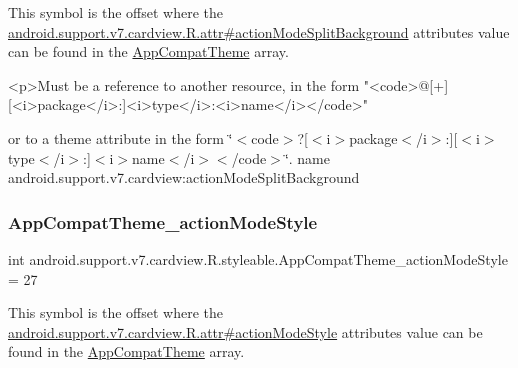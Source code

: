This symbol is the offset where the \hyperlink{classandroid_1_1support_1_1v7_1_1cardview_1_1R_1_1attr_aa4274d8662f21f4ce9f787ee5bfd927a}{android.\+support.\+v7.\+cardview.\+R.\+attr\#action\+Mode\+Split\+Background} attribute\textquotesingle{}s value can be found in the \hyperlink{classandroid_1_1support_1_1v7_1_1cardview_1_1R_1_1styleable_a52e6f69f954ecc2622d72c0b4d298938}{App\+Compat\+Theme} array.

\begin{DoxyVerb}      <p>Must be a reference to another resource, in the form "<code>@[+][<i>package</i>:]<i>type</i>:<i>name</i></code>"
\end{DoxyVerb}
 or to a theme attribute in the form \char`\"{}$<$code$>$?\mbox{[}$<$i$>$package$<$/i$>$\+:\mbox{]}\mbox{[}$<$i$>$type$<$/i$>$\+:\mbox{]}$<$i$>$name$<$/i$>$$<$/code$>$\char`\"{}.  name android.\+support.\+v7.\+cardview\+:action\+Mode\+Split\+Background \mbox{\label{classandroid_1_1support_1_1v7_1_1cardview_1_1R_1_1styleable_a50c09e1d32d726cfef89e5ad6164aac9}} 
\subsubsection{\texorpdfstring{App\+Compat\+Theme\+\_\+action\+Mode\+Style}{AppCompatTheme\_actionModeStyle}}
{\footnotesize\ttfamily int android.\+support.\+v7.\+cardview.\+R.\+styleable.\+App\+Compat\+Theme\+\_\+action\+Mode\+Style = 27\hspace{0.3cm}{\ttfamily [static]}}

This symbol is the offset where the \hyperlink{classandroid_1_1support_1_1v7_1_1cardview_1_1R_1_1attr_acd95c50299a613cf031557f3da7bc3ea}{android.\+support.\+v7.\+cardview.\+R.\+attr\#action\+Mode\+Style} attribute\textquotesingle{}s value can be found in the \hyperlink{classandroid_1_1support_1_1v7_1_1cardview_1_1R_1_1styleable_a52e6f69f954ecc2622d72c0b4d298938}{App\+Compat\+Theme} array.

